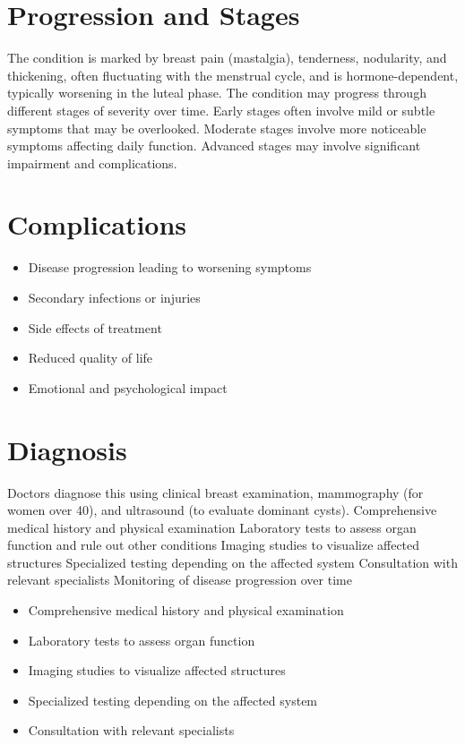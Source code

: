 \section{Progression and Stages}
The condition is marked by breast pain (mastalgia), tenderness, nodularity, and thickening, often fluctuating with the menstrual cycle, and is hormone-dependent, typically worsening in the luteal phase. The condition may progress through different stages of severity over time. Early stages often involve mild or subtle symptoms that may be overlooked. Moderate stages involve more noticeable symptoms affecting daily function. Advanced stages may involve significant impairment and complications.
\section{Complications}
\begin{itemize}[noitemsep]
  \item Disease progression leading to worsening symptoms
  \item Secondary infections or injuries
  \item Side effects of treatment
  \item Reduced quality of life
  \item Emotional and psychological impact
\end{itemize}
\section{Diagnosis}
Doctors diagnose this using clinical breast examination, mammography (for women over 40), and ultrasound (to evaluate dominant cysts). Comprehensive medical history and physical examination Laboratory tests to assess organ function and rule out other conditions Imaging studies to visualize affected structures Specialized testing depending on the affected system Consultation with relevant specialists Monitoring of disease progression over time

\begin{itemize}[noitemsep]
  \item Comprehensive medical history and physical examination
  \item Laboratory tests to assess organ function
  \item Imaging studies to visualize affected structures
  \item Specialized testing depending on the affected system
  \item Consultation with relevant specialists
\end{itemize}
